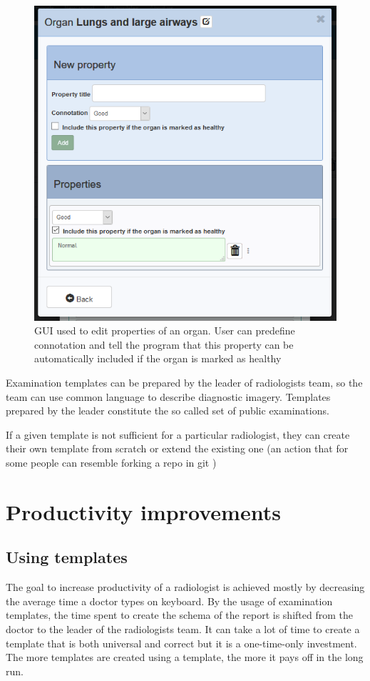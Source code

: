 \documentclass[12pt, twoside, openany]{report}
\theoremstyle{definition}
\begin{document}
\begin{figure}
    \centering
    \includegraphics{template-property-list}
    \caption{GUI used to edit properties of an organ. User can predefine connotation and tell the program that this property can be automatically included if the organ is marked as healthy \label{fig:template-property-list}}
\end{figure}

Examination templates can be prepared by the leader of radiologists team, so the team can use common language to describe diagnostic imagery. Templates prepared by the leader constitute the so called set of public examinations.

If a given template is not sufficient for a particular radiologist, they can  create their own template from scratch or extend the existing one (an action that for some people can resemble forking a repo in git \cite{forking})




\section{Productivity improvements}
\subsection{Using templates}
The goal to increase productivity of a radiologist is achieved mostly by decreasing the average time a doctor types on keyboard. By the usage of examination templates, the time spent to create the schema of the report is shifted from the doctor to the leader of the radiologists team. It can take a lot of time to create a template that is both universal and correct but it is a one-time-only investment. The more templates are created using a template, the more it pays off in the long run.
\end{document}
